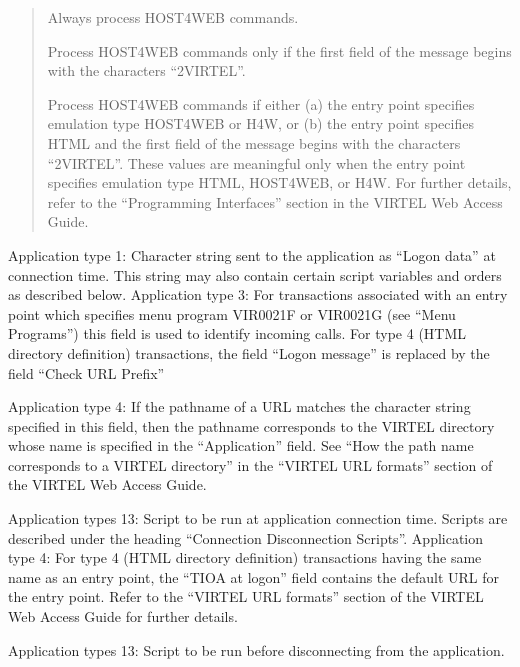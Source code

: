 \documentclass[letterpaper,10pt,english]{sphinxmanual}
\begin{document}
\begin{description}
\begin{quote}
\begin{description}
\sphinxAtStartPar
Always process HOST4WEB commands.

\sphinxAtStartPar
Process HOST4WEB commands only if the first field of the message begins with the characters “2VIRTEL”.

\sphinxAtStartPar
Process HOST4WEB commands if either (a) the entry point specifies emulation type HOST4WEB or H4W, or (b) the entry point specifies HTML and the first field of the message begins with the characters “2VIRTEL”.
These values are meaningful only when the entry point specifies emulation type HTML, HOST4WEB, or H4W. For further details, refer to the “Programming Interfaces” section in the VIRTEL Web Access Guide.

\end{description}
\end{quote}

\sphinxAtStartPar
Application type 1: Character string sent to the application as “Logon data” at connection time. This string may also contain certain script variables and orders as described below.
Application type 3: For transactions associated with an entry point which specifies menu program VIR0021F or VIR0021G (see “Menu Programs”) this field is used to identify incoming calls. For type 4 (HTML directory definition) transactions, the field “Logon message” is replaced by the field “Check URL Prefix”

\sphinxAtStartPar
Application type 4: If the pathname of a URL matches the character string specified in this field, then the pathname corresponds to the VIRTEL directory whose name is specified in the “Application” field. See “How the path name corresponds to a VIRTEL directory” in the “VIRTEL URL formats” section of the VIRTEL Web Access Guide.

\sphinxAtStartPar
Application types 1\sphinxhyphen{}3: Script to be run at application connection time. Scripts are described under the heading “Connection \textendash{} Disconnection Scripts”. Application type 4: For type 4 (HTML directory definition) transactions having the same name as an entry point, the “TIOA at logon” field contains the default URL for the entry point. Refer to the “VIRTEL URL formats” section of the VIRTEL Web Access Guide for further details.

\sphinxAtStartPar
Application types 1\sphinxhyphen{}3: Script to be run before disconnecting from the application.

\end{description}
\end{document}
